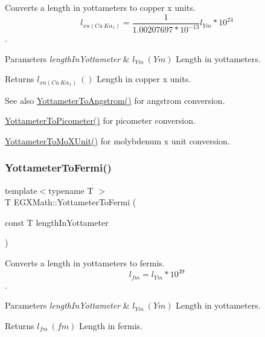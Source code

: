 Converts a length in yottameters to copper x units. \[ l_{xu(Cu\ K\alpha_1)}= \frac{1}{1.00207697*10^{-13}} l_{Ym} * 10^{24}\]. 


\begin{DoxyParams}{Parameters}
{\em length\+In\+Yottameter} & $ l_{Ym}\ (Ym)$ Length in yottameters. \\
\hline
\end{DoxyParams}
\begin{DoxyReturn}{Returns}
$ l_{xu(Cu\ K\alpha_1)}\ ()$ Length in copper x units. 
\end{DoxyReturn}
\begin{DoxySeeAlso}{See also}
\mbox{\hyperlink{group___e_g_x_math-_conversions-_length_conversions-_yottameter-_non-_s_i_ga0129b788ceb2d7d4ce86c155ee9d4675}{Yottameter\+To\+Angstrom()}} for angstrom conversion. 

\mbox{\hyperlink{group___e_g_x_math-_conversions-_length_conversions-_yottameter-_s_i_ga7af9d1314de06921546f079641c033b2}{Yottameter\+To\+Picometer()}} for picometer conversion. 

\mbox{\hyperlink{group___e_g_x_math-_conversions-_length_conversions-_yottameter-_non-_s_i_ga545da9526f7a62f5ca7d1800faf17d1d}{Yottameter\+To\+Mo\+X\+Unit()}} for molybdenum x unit conversion. 
\end{DoxySeeAlso}
\mbox{\label{group___e_g_x_math-_conversions-_length_conversions-_yottameter-_non-_s_i_gabf900c05975691fab8c5df7de16a467c}} 
\subsubsection{\texorpdfstring{Yottameter\+To\+Fermi()}{YottameterToFermi()}}
{\footnotesize\ttfamily template$<$typename T $>$ \\
T E\+G\+X\+Math\+::\+Yottameter\+To\+Fermi (\begin{DoxyParamCaption}\item[{const T}]{length\+In\+Yottameter }\end{DoxyParamCaption})}



Converts a length in yottameters to fermis. \[ l_{fm}=l_{Ym} * 10^{39} \]. 


\begin{DoxyParams}{Parameters}
{\em length\+In\+Yottameter} & $ l_{Ym}\ (Ym)$ Length in yottameters. \\
\hline
\end{DoxyParams}
\begin{DoxyReturn}{Returns}
$ l_{fm}\ (fm)$ Length in fermis. 
\end{DoxyReturn}
\mbox{\label{group___e_g_x_math-_conversions-_length_conversions-_yottameter-_non-_s_i_gaad96d515763b1dfbcd968020e1b97de4}} 
